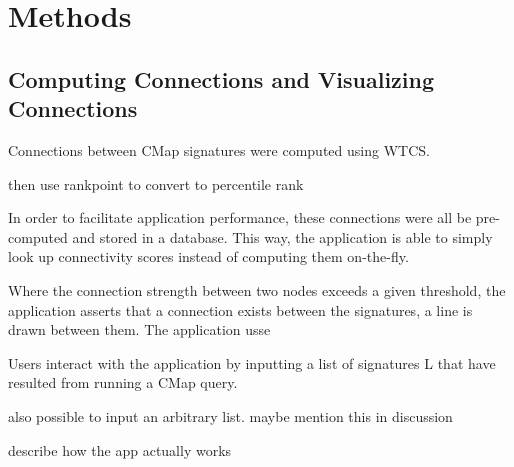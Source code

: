 \documentclass[12pt]{article}
\begin{document}
\section{Methods}
\subsection{Computing Connections and Visualizing Connections}

Connections between CMap signatures were computed using WTCS. 

then use rankpoint to convert to percentile rank

In order to facilitate application performance, these connections were all be pre-computed and stored in a database. This way, the application is able to simply look up connectivity scores instead of computing them on-the-fly.

Where the connection strength between two nodes exceeds a given threshold, the application asserts that a connection exists between the signatures, a line is drawn between them. The application usse


Users interact with the application by inputting a list of signatures L that have resulted from running a CMap query. 

also possible to input an arbitrary list. maybe mention this in discussion


describe how the app actually works


\end{document}
